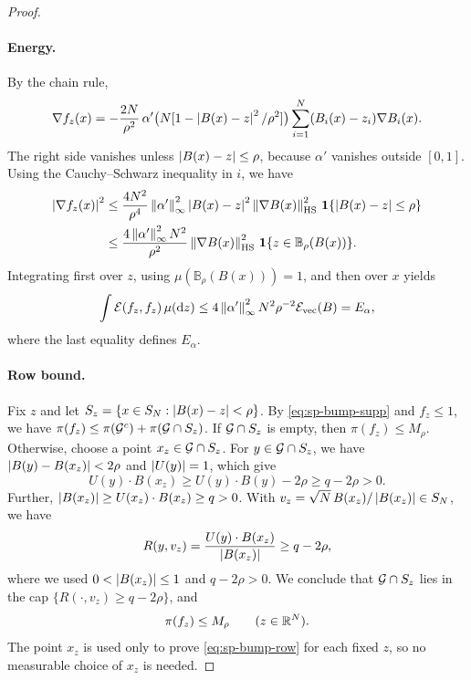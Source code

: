 \begin{proof}
\paragraph{Energy.} By the chain rule,
\[
\nabla f_z(x)=-\frac{2N}{\rho^2}\,\alpha'\big(N[1-\left|B(x)-z\right|^2/\rho^2]\big)\sum_{i=1}^N(B_i(x)-z_i)\nabla B_i(x).
\]
The right side vanishes unless $\left|B(x)-z\right|\le\rho$, because $\alpha'$ vanishes outside $[0,1]$. Using the Cauchy--Schwarz inequality in $i$, we have
\begin{align*}
\left|\nabla f_z(x)\right|^2&\le\frac{4N^2}{\rho^4}\left\lVert\alpha'\right\rVert_\infty^2\left|B(x)-z\right|^2\left\lVert\nabla B(x)\right\rVert_{\rm HS}^2\,\mathbf 1\{\left|B(x)-z\right|\le\rho\}\\
&\le\frac{4\left\lVert\alpha'\right\rVert_\infty^2N^2}{\rho^2}\left\lVert\nabla B(x)\right\rVert_{\rm HS}^2\,\mathbf 1\{z\in\mathbb B_\rho(B(x))\}.
\end{align*}
Integrating first over $z$, using $\mu(\mathbb B_\rho(B(x)))=1$, and then over $x$ yields
\begin{equation}\label{eq:sp-bump-energy}
\int\mathcal E(f_z,f_z)\,\mu(\mathrm dz)\le4\left\lVert\alpha'\right\rVert_\infty^2N^2\rho^{-2}\mathcal E_{\rm vec}(B)=E_\alpha,
\end{equation}
where the last equality defines $E_\alpha$.

\paragraph{Row bound.} Fix $z$ and let $S_z=\{x\in S_N:\left|B(x)-z\right|<\rho\}$. By \eqref{eq:sp-bump-supp} and $f_z\le1$, we have $\pi(f_z)\le\pi(\mathcal G^c)+\pi(\mathcal G\cap S_z)$. If $\mathcal G\cap S_z$ is empty, then $\pi(f_z)\le M_\rho$. Otherwise, choose a point $x_z\in\mathcal G\cap S_z$. For $y\in\mathcal G\cap S_z$, we have $\left|B(y)-B(x_z)\right|<2\rho$ and $\left|U(y)\right|=1$, which give
\[
U(y)\cdot B(x_z)\ge U(y)\cdot B(y)-2\rho\ge q-2\rho>0.
\]
Further, $\left|B(x_z)\right|\ge U(x_z)\cdot B(x_z)\ge q>0$. With $v_z=\sqrt N\,B(x_z)/\left|B(x_z)\right|\in S_N$, we have
\[
R(y,v_z)=\frac{U(y)\cdot B(x_z)}{\left|B(x_z)\right|}\ge q-2\rho,
\]
where we used $0<\left|B(x_z)\right|\le1$ and $q-2\rho>0$. We conclude that $\mathcal G\cap S_z$ lies in the cap $\{R(\cdot,v_z)\ge q-2\rho\}$, and
\begin{equation}\label{eq:sp-bump-row}
\pi(f_z)\le M_\rho\qquad(z\in\mathbb R^N).
\end{equation}
The point $x_z$ is used only to prove \eqref{eq:sp-bump-row} for each fixed $z$, so no measurable choice of $x_z$ is needed.


\end{proof}
